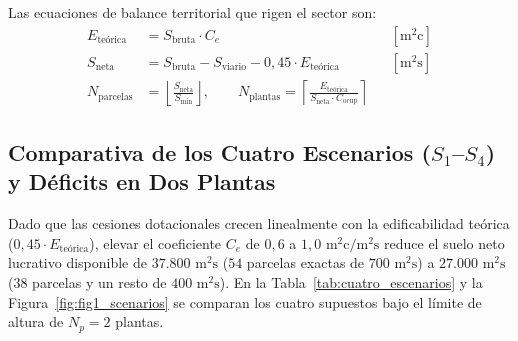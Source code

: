 Las ecuaciones de balance territorial que rigen el sector son:
\begin{align}
  E_{\text{teórica}} &= S_{\text{bruta}} \cdot C_e && [\text{m}^2\text{c}] \\
  S_{\text{neta}} &= S_{\text{bruta}} - S_{\text{viario}} - 0,45 \cdot E_{\text{teórica}} && [\text{m}^2\text{s}] \\
  N_{\text{parcelas}} &= \left\lfloor \frac{S_{\text{neta}}}{S_{\min}} \right\rfloor, \qquad
  N_{\text{plantas}} = \left\lceil \frac{E_{\text{teórica}}}{S_{\text{neta}} \cdot C_{\text{ocup}}} \right\rceil &&
\end{align}

\subsection{Comparativa de los Cuatro Escenarios ($S_1$--$S_4$) y Déficits en Dos Plantas}
\label{sub:escenarios_s1_s4}

Dado que las cesiones dotacionales crecen linealmente con la edificabilidad teórica ($0,45 \cdot E_{\text{teórica}}$), elevar el coeficiente $C_e$ de $0,6$ a $1,0\text{ m}^2\text{c}/\text{m}^2\text{s}$ reduce el suelo neto lucrativo disponible de $37.800\text{ m}^2\text{s}$ ($54$ parcelas exactas de $700\text{ m}^2\text{s}$) a $27.000\text{ m}^2\text{s}$ ($38$ parcelas y un resto de $400\text{ m}^2\text{s}$). En la Tabla~\ref{tab:cuatro_escenarios} y la Figura~\ref{fig:fig1_scenarios} se comparan los cuatro supuestos bajo el límite de altura de $N_p = 2$ plantas.

